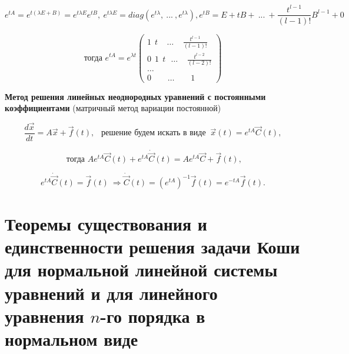 \[ e^{tA} = e^{t(\lambda E + B)} = e^{t\lambda E}e^{tB},\ e^{t\lambda E} = diag(e^{t\lambda},\ ...\ , e^{t\lambda}), e^{tB} = E + tB +\ ...\ + \frac{t^{l-1}}{(l-1)!}B^{l-1} + 0 \]

\begin{equation*}
	\text{тогда } e^{tA} = e^{\lambda t}
 	\begin{pmatrix}
            1\ \ t\ \ \ \ \  \dots\ \ \ \ \ \frac{t^{l-1}}{(l-1)!} \\
            0\ \ 1\ \ t\ \ \ \dots\ \ \ \ \  \frac{t^{l-2}}{(l-2)!} \\
            \dots \\
            0\ \ \ \ \ \ \ \ \ \dots\ \ \ \ \ \ \ \ \  1
    \end{pmatrix}
\end{equation*}

\textbf{Метод решения линейных неоднородных уравнений с постоянными коэффициентами} (матричный метод вариации постоянной)

\[ \frac{d\vec{x}}{dt} = A\vec{x} + \vec{f}(t),\ \ \text{ решение будем искать в виде } \ \vec{x}(t) = e^{tA}\vec{C}(t), \]

\[ \text{ тогда } Ae^{tA}\vec{C}(t) + e^{tA}\dot{\vec{C}}(t) = Ae^{tA}\vec{C} + \vec{f}(t),\]

\[ e^{tA}\dot{\vec{C}}(t) = \vec{f}(t)\ \Rightarrow \dot{\vec{C}}(t) = (e^{tA})^{-1}\vec{f}(t) = e^{-tA}\vec{f}(t). \]

\section{Теоремы существования и единственности решения задачи Коши для нормальной линейной системы уравнений и
для линейного уравнения $n$-го порядка в нормальном виде}



 
